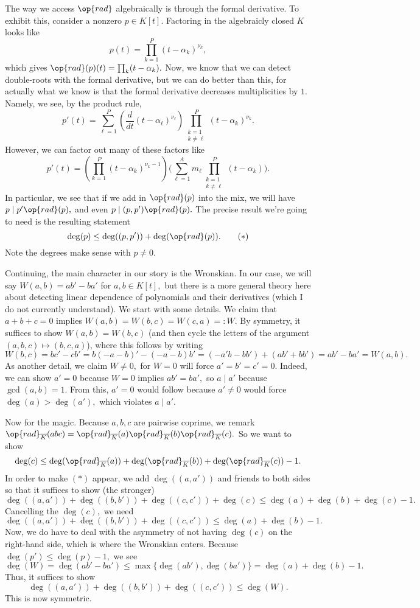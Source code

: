 The way we access $\op{rad}$ algebraically is through the formal derivative. To exhibit this, consider a nonzero $p\in K[t].$ Factoring in the algebraicly closed $K$ looks like
\[p(t)=\prod_{k=1}^P(t-\alpha_k)^{\nu_k},\]
which gives $\op{rad}(p)(t)=\prod_k(t-\alpha_k).$ Now, we know that we can detect double-roots with the formal derivative, but we can do better than this, for actually what we know is that the formal derivative decreases multiplicities by $1.$ Namely, we see, by the product rule,
\[p'(t)=\sum_{\ell=1}^P\left(\frac d{dt}(t-\alpha_\ell)^{\nu_\ell}\right)\prod_{\substack{k=1\\k\ne\ell}}^P(t-\alpha_k)^{\nu_k}.\]
However, we can factor out many of these factors like
\[p'(t)=\left(\prod_{k=1}^P(t-\alpha_k)^{\nu_k-1}\right)\Bigg(\sum_{\ell=1}^Am_\ell\prod_{\substack{k=1\\k\ne\ell}}^P(t-\alpha_k)\Bigg).\]
In particular, we see that if we add in $\op{rad}(p)$ into the mix, we will have $p\mid p'\op{rad}(p),$ and even $p\mid(p,p')\op{rad}(p).$ The precise result we're going to need is the resulting statement
\[\deg(p)\le\deg((p,p'))+\deg(\op{rad}(p)).\tag{$*$}\label{eq:rad-der}\]
Note the degrees make sense with $p\ne0.$

Continuing, the main character in our story is the Wronskian. In our case, we will say $W(a,b)=ab'-ba'$ for $a,b\in K[t],$ but there is a more general theory here about detecting linear dependence of polynomials and their derivatives (which I do not currently understand). We start with some details. We claim that $a+b+c=0$ implies $W(a,b)=W(b,c)=W(c,a)=:W.$ By symmetry, it suffices to show $W(a,b)=W(b,c)$ (and then cycle the letters of the argument $(a,b,c)\mapsto(b,c,a)$), where this follows by writing
\[W(b,c)=bc'-cb'=b(-a-b)'-(-a-b)b'=(-a'b-bb')+(ab'+bb')=ab'-ba'=W(a,b).\]
As another detail, we claim $W\ne0,$ for $W=0$ will force $a'=b'=c'=0.$ Indeed, we can show $a'=0$ because $W=0$ implies $ab'=ba',$ so $a\mid a'$ because $\gcd(a,b)=1.$ From this, $a'=0$ would follow because $a'\ne0$ would force $\deg(a)>\deg(a'),$ which violates $a\mid a'.$

Now for the magic. Because $a,b,c$ are pairwise coprime, we remark $\op{rad}_{\overline K}(abc)=\op{rad}_{\overline K}(a)\op{rad}_{\overline K}(b)\op{rad}_{\overline K}(c).$ So we want to show
\[\deg(c)\le\deg(\op{rad}_{\overline K}(a))+\deg(\op{rad}_{\overline K}(b))+\deg(\op{rad}_{\overline K}(c))-1.\]
In order to make \hyperref[eq:rad-der]{$(*)$} appear, we add $\deg((a,a'))$ and friends to both sides so that it suffices to show (the stronger)
\[\deg((a,a'))+\deg((b,b'))+\deg((c,c'))+\deg(c)\le\deg(a)+\deg(b)+\deg(c)-1.\]
Cancelling the $\deg(c),$ we need
\[\deg((a,a'))+\deg((b,b'))+\deg((c,c'))\le\deg(a)+\deg(b)-1.\]
Now, we do have to deal with the asymmetry of not having $\deg(c)$ on the right-hand side, which is where the Wronskian enters. Because $\deg(p')\le\deg(p)-1,$ we see 
\[\deg(W)=\deg(ab'-ba')\le\max\{\deg(ab'),\deg(ba')\}=\deg(a)+\deg(b)-1.\]
Thus, it suffices to show
\[\deg((a,a'))+\deg((b,b'))+\deg((c,c'))\le\deg(W).\]
This is now symmetric.

